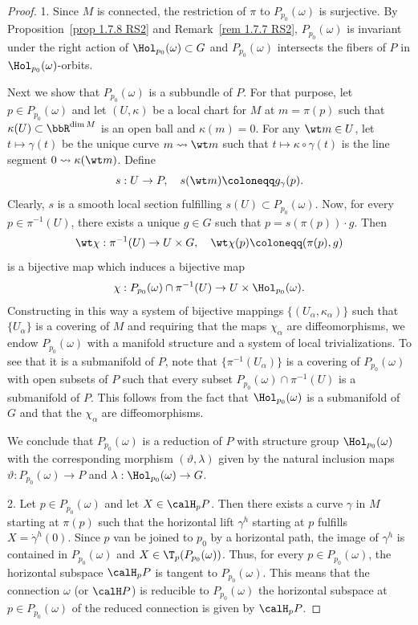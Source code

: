 \begin{proof}
    1. Since $M$ is connected, the restriction of $\pi$ to $P_{p_0}(\omega)$ is surjective. By Proposition~\ref{prop 1.7.8 RS2} and Remark~\ref{rem 1.7.7 RS2}, $P_{p_0}(\omega)$ is invariant under the right action of $\Hol_{p_0}(\omega)\subset G$ and $P_{p_0}(\omega)$ intersects the fibers of $P$ in $\Hol_{p_0}(\omega)$-orbits.

    Next we show that $P_{p_0}(\omega)$ is a subbundle of $P$. For that purpose, let $p\in P_{p_0}(\omega)$ and let $(U,\kappa)$ be a local chart for $M$ at $m=\pi(p)$ such that $\kappa(U)\subset\bbR^{\dim M}$ is an open ball and $\kappa(m)=0$. For any $\wt m\in U$, let $t\mapsto \gamma(t)$ be the unique curve  $m\leadsto \wt m$ such that $t\mapsto \kappa\circ\gamma(t)$ is the line segment $0\leadsto \kappa(\wt m)$. Define
    \[s:U\to P,\quad s(\wt m)\coloneqq g_{\gamma}(p).\]
    Clearly, $s$ is a smooth local section fulfilling $s(U)\subset P_{p_0}(\omega)$. Now, for every $p\in \pi^{-1}(U)$, there exists a unique $g\in G$ such that $p=s(\pi(p))\cdot g$. Then
    \[\wt\chi:\pi^{-1}(U)\to U\times G,\quad \wt\chi(p)\coloneqq (\pi(p),g)\]
    is a bijective map which induces a bijective map
    \[\chi:P_{p_0}(\omega)\cap\pi^{-1}(U)\to U\times \Hol_{p_0}(\omega).\]
    Constructing in this way a system of bijective mappings $\{(U_\alpha,\kappa_\alpha)\}$ such that $\{U_\alpha\}$ is a covering of $M$ and requiring that the maps $\chi_\alpha$ are diffeomorphisms, we endow $P_{p_0}(\omega)$ with a manifold structure and a system of local trivializations. To see that it is a submanifold of $P$, note that $\{\pi^{-1}(U_\alpha)\}$ is a covering of $P_{p_0}(\omega)$ with open subsets of $P$ such that every subset $P_{p_0}(\omega)\cap\pi^{-1}(U)$ is a submanifold of $P$. This follows from the fact that $\Hol_{p_0}(\omega)$ is a submanifold of $G$ and that the $\chi_\alpha$ are diffeomorphisms.

    We conclude that $P_{p_0}(\omega)$ is a reduction of $P$ with structure group $\Hol_{p_0}(\omega)$ with the corresponding morphism $(\vartheta,\lambda)$ given by the natural inclusion maps $\vartheta:P_{p_0}(\omega)\to P$ and $\lambda:\Hol_{p_0}(\omega)\to G$.

    2. Let $p\in P_{p_0}(\omega)$ and let $X\in\calH_p P$. Then there exists a curve $\gamma$ in $M$ starting at $\pi(p)$ such that the horizontal lift $\gamma^h$ starting at $p$ fulfills $X=\dot\gamma^h(0)$. Since $p$ van be joined to $p_0$ by a horizontal path, the image of $\gamma^h$ is contained in $P_{p_0}(\omega)$ and $X\in \T_p(P_{p_0}(\omega))$. Thus, for every $p\in P_{p_0}(\omega)$, the horizontal subspace $\calH_p P$ is tangent to $P_{p_0}(\omega)$. This means that the connection $\omega$ (or $\calH P$) is reducible to $P_{p_0}(\omega)$ the horizontal subspace at $p\in P_{p_0}(\omega)$ of the reduced connection is given by $\calH_p P$.
\end{proof}

